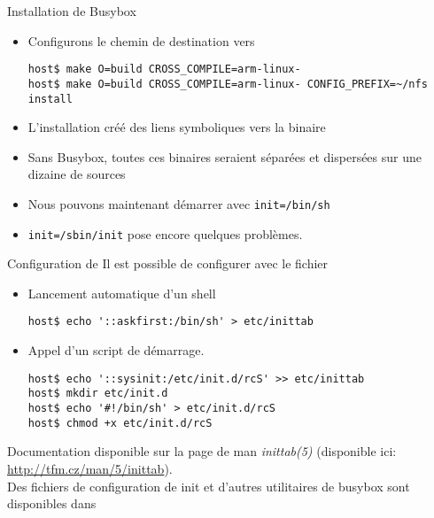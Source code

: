 \begin{frame}[fragile=singleslide]{Installation de Busybox}
  \begin{itemize}
  \item Configurons le chemin de destination vers 
    \begin{lstlisting}
host$ make O=build CROSS_COMPILE=arm-linux-
host$ make O=build CROSS_COMPILE=arm-linux- CONFIG_PREFIX=~/nfs install
    \end{lstlisting}
  \item  L'installation créé  des  liens symboliques  vers la  binaire
  \item  Sans  Busybox,  toutes  ces  binaires  seraient  séparées  et
    dispersées sur une dizaine de sources
  \item Nous pouvons maintenant démarrer avec \verb+init=/bin/sh+
  \item \verb+init=/sbin/init+ pose encore quelques problèmes.
  \end{itemize}
\end{frame}

\begin{frame}[fragile=singleslide]{Configuration de }
  Il est possible de configurer  avec le fichier
  \begin{itemize}
  \item Lancement automatique d'un shell
    \begin{lstlisting}
host$ echo '::askfirst:/bin/sh' > etc/inittab 
    \end{lstlisting}
  \item Appel d'un script de démarrage.
    \begin{lstlisting}
host$ echo '::sysinit:/etc/init.d/rcS' >> etc/inittab 
host$ mkdir etc/init.d
host$ echo '#!/bin/sh' > etc/init.d/rcS
host$ chmod +x etc/init.d/rcS
    \end{lstlisting}
  \end{itemize}
  Documentation disponible sur la page de man \emph{inittab(5)}
  (disponible ici: \url{http://tfm.cz/man/5/inittab}).\\[2ex]
  Des  fichiers de  configuration  de init  et  d'autres utilitaires  de
  busybox sont disponibles dans 
\end{frame}

